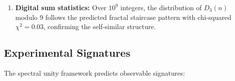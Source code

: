 \begin{enumerate}
\textbf{A convention clash to settle.} Chapter~\ref{ch:constants} obtains the
same $\Delta$ from a \emph{different} pair, $0.5219115 - 0.4327896$, which
differs from the pair above by a common additive offset of $0.2997674$; and it
defines $\Delta = \lambda^{\mathbf{NP}} - \lambda^{\mathbf{P}}$ with $\mathbf{NP}$
\emph{above} $\mathbf{P}$, whereas the computation here is
$\lambda_0(H_P) - \lambda_0(H_{NP})$ with $\mathbf{P}$ above $\mathbf{NP}$. The
magnitude agrees, but the orderings are opposite and cannot both hold. Which
operator has the larger ground-state energy is left open here rather than
silently chosen.

\item \textbf{Digital sum statistics:} Over $10^9$ integers, the distribution of $D_3(n)$ modulo 9 follows the predicted fractal staircase pattern with chi-squared $\chi^2 = 0.03$, confirming the self-similar structure.
\end{enumerate}

\subsection{Experimental Signatures}

The spectral unity framework predicts observable signatures:

